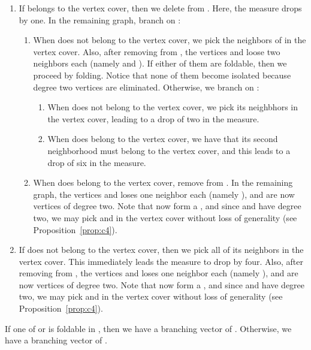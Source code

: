 \documentclass[svgnames]{llncs}
\newcommand{\branchvector}[1]{{\color{IndianRed}{}}}
\begin{document}
{\begin{enumerate}[resume=main,label=\bfseries Case~\arabic*:]
\begin{enumdescript}
\begin{enumerate}
\item If  belongs to the vertex cover, then we delete  from . Here, the measure drops by one. In the remaining graph, branch on :
\begin{enumerate}
\item When  does not belong to the vertex cover, we pick the neighbors of  in the vertex cover. Also, after removing  from , the vertices  and  loose two neighbors each (namely  and ). 
If either of them are foldable, then we proceed by folding. Notice that none of them become isolated because degree two vertices are eliminated. Otherwise, we branch on :
\begin{enumerate}
\item When  does not belong to the vertex cover, we pick its neighbhors in the vertex cover, leading to a drop of two in the measure.
\item When  does belong to the vertex cover, we have that its second neighborhood must belong to the vertex cover, and this leads to a drop of six in the measure.
\end{enumerate}
\item When  does belong to the vertex cover, remove  from . In the remaining graph, the vertices  and  loses one neighbor each (namely ), and are now vertices of degree two. 
Note that  now form a , and since  and  have degree two, we may pick  and  in the vertex cover without loss of generality (see Proposition~\ref{prop:c4}).  
\end{enumerate}    
\item If  does not belong to the vertex cover, then we pick all of its neighbors in the vertex cover. This immediately leads the measure to drop by four. Also, after 
removing  from , the vertices  and  loses one neighbor each (namely ), and are now vertices of degree two. Note that  now form a , and since  and  have degree two, 
we may pick  and  in the vertex cover without loss of generality (see Proposition~\ref{prop:c4}).  
\end{enumerate}

If one of  or  is foldable in , then we have a branching vector of \branchvector{4,5,6}. Otherwise, we have a branching vector of \branchvector{4,10,6,6}.


\begin{figure}[ht]
\centering
\begin{minipage}[c]{0.45\linewidth}
\scalebox{.75}{\begin{tikzpicture}
[outline/.style={color=SlateBlue,thin},
happy/.style={color=OrangeRed,thin},
general/.style={color=black,thin}]



\end{tikzpicture}}
\end{minipage}
\end{figure}
\end{enumdescript}
\end{enumerate}}
\end{document}
